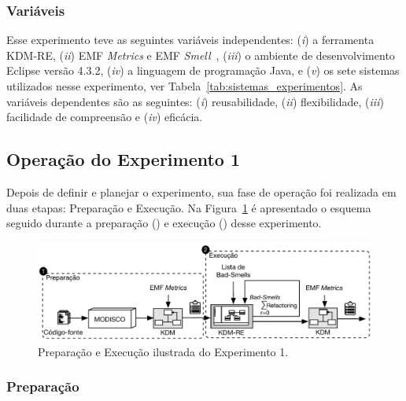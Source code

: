 \subsubsection{Variáveis}

Esse experimento teve as seguintes variáveis independentes: (\textit{i}) a ferramenta KDM-RE, (\textit{ii}) EMF \textit{Metrics} e EMF \textit{Smell}~\cite{Arendt_2012}, (\textit{iii}) o ambiente de desenvolvimento Eclipse versão 4.3.2, (\textit{iv}) a linguagem de programação Java, e (\textit{v}) os sete sistemas utilizados nesse experimento, ver Tabela~\ref{tab:sistemas_experimentos}. As variáveis dependentes são as seguintes: (\textit{i}) reusabilidade, (\textit{ii}) flexibilidade, (\textit{iii}) facilidade de compreensão e (\textit{iv}) eficácia.

\subsection{Operação do Experimento 1}

Depois de definir e planejar o experimento, sua fase de operação foi realizada em duas etapas: Preparação e Execução. Na Figura~\ref{fig:execucao_experimento} é apresentado o esquema seguido durante a preparação () e execução () desse experimento.

\begin{figure}[h]
	\centering
	\caption{Preparação e Execução ilustrada do Experimento 1.}
	\label{fig:execucao_experimento}
	\includegraphics[scale=0.9]{images/Figura_Experimento}
	\fautor
\end{figure}

\subsubsection{Preparação}

